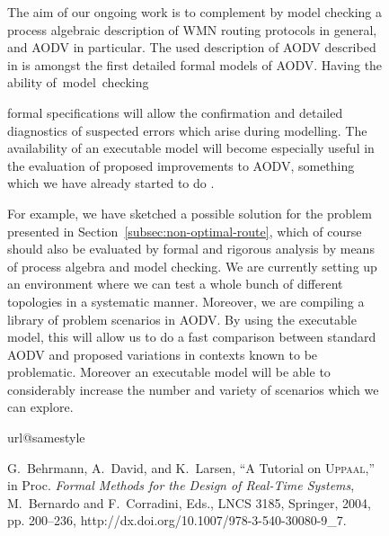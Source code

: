 \documentclass[conference,twoside]{IEEEtran}
\begin{document}
\begin{figure}[h]
{\begin{minipage}{0.6\linewidth}
The aim of our ongoing work is to complement by model checking
a process algebraic description of WMN routing protocols in general, and AODV in particular.
The used description of AODV described in \cite{TR11} is amongst the
first detailed formal models of AODV.
Having the ability of~model~checking
\newpage

formal specifications will allow the confirmation and detailed
diagnostics of suspected errors which arise during modelling.
The availability of an executable model will become especially useful
in the evaluation of proposed improvements to AODV,  something which
we have already started to do \cite{TR11}.

For example, we have sketched a possible solution for the problem
presented in Section~\ref{subsec:non-optimal-route}, which of course
should also be evaluated by formal and rigorous analysis by means of
process algebra and model checking.
We are currently setting up an environment where we can
test a whole bunch of different topologies in a systematic manner. Moreover, we are compiling a library of problem scenarios in AODV. By using the executable model, this will allow us to do a fast comparison between standard AODV and proposed variations in contexts  known to be problematic.
Moreover an executable model will be able to considerably increase the number and variety of scenarios which we can explore.


\begin{thebibliography}{10}
\providecommand{\url}[1]{#1}
\csname url@samestyle\endcsname
\providecommand{\newblock}{\relax}
\providecommand{\bibinfo}[2]{#2}
\providecommand{\BIBentrySTDinterwordspacing}{\spaceskip=0pt\relax}
\providecommand{\BIBentryALTinterwordstretchfactor}{4}
\providecommand{\BIBentryALTinterwordspacing}{\spaceskip=\fontdimen2\font plus
\BIBentryALTinterwordstretchfactor\fontdimen3\font minus
  \fontdimen4\font\relax}
\providecommand{\BIBforeignlanguage}[2]{{\expandafter\ifx\csname l@#1\endcsname\relax
\typeout{** WARNING: IEEEtranS.bst: No hyphenation pattern has been}\typeout{** loaded for the language `#1'. Using the pattern for}\typeout{** the default language instead.}\else
\language=\csname l@#1\endcsname
\fi
#2}}
\providecommand{\BIBdecl}{\relax}
\BIBdecl

G.~Behrmann, A.~David, and K.~Larsen, ``{A Tutorial on \textsc{Uppaal}},'' in
  Proc. \emph{Formal Methods for the Design of Real-Time Systems},
  M.~Bernardo and F.~Corradini, Eds., LNCS 3185, Springer, 2004, pp. 200--236,
  \url{http://dx.doi.org/10.1007/978-3-540-30080-9\_7}.


\end{thebibliography}
\end{minipage}}
\end{figure}
\end{document}
